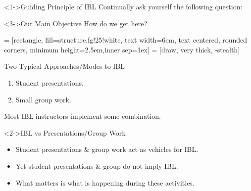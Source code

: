 \documentclass[10pt]{beamer}
\begin{document}
\begin{frame}

\begin{block}<1->{Guiding Principle of IBL}
Continually ask yourself the following question:

\vspace{1em}


\end{block}

\begin{block}<3->{Our Main Objective}
How do we get here?

\begin{center}
 = [rectangle, fill=structure.fg!25!white, text width=6em, text centered, rounded corners, minimum height=2.5em,inner sep=1ex]
 = [draw, very thick, -stealth]
\end{center}
\end{block}

\end{frame}


\begin{frame}

\begin{block}{Two Typical Approaches/Modes to IBL}
\begin{enumerate}
\item Student presentations.
\item Small group work.
\end{enumerate}
Most IBL instructors implement some combination.
\end{block}

\begin{block}<2->{IBL vs Presentations/Group Work}
\begin{itemize}
\item<3-> Student presentations \& group work act as vehicles for IBL. 
\item<4-> Yet student presentations \& group do not imply IBL. 
\item<5-> What matters is what is happening during these activities.
\end{itemize}
\end{block}

\end{frame}
\end{document}
